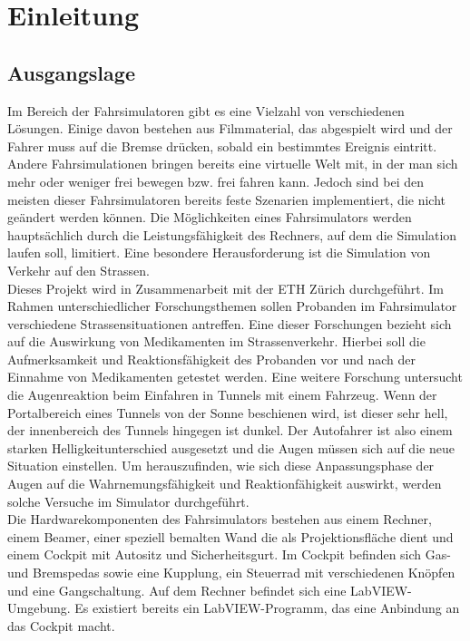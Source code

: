 \section{Einleitung}
\subsection{Ausgangslage}

Im Bereich der Fahrsimulatoren gibt es eine Vielzahl von verschiedenen Lösungen. Einige davon bestehen aus Filmmaterial, das abgespielt wird und der Fahrer muss auf die Bremse drücken, sobald ein bestimmtes Ereignis eintritt. Andere Fahrsimulationen bringen bereits eine virtuelle Welt mit, in der man sich mehr oder weniger frei bewegen bzw. frei fahren kann. Jedoch sind bei den meisten dieser Fahrsimulatoren bereits feste Szenarien implementiert, die  nicht geändert werden können. Die Möglichkeiten eines Fahrsimulators werden hauptsächlich durch die Leistungsfähigkeit des Rechners, auf dem die Simulation laufen soll, limitiert. Eine besondere Herausforderung ist die Simulation von Verkehr auf den Strassen. \\
Dieses Projekt wird in Zusammenarbeit mit der ETH Zürich durchgeführt. Im Rahmen unterschiedlicher Forschungsthemen sollen Probanden im Fahrsimulator verschiedene Strassensituationen antreffen. Eine dieser Forschungen bezieht sich auf die Auswirkung von Medikamenten im Strassenverkehr. Hierbei soll die Aufmerksamkeit und Reaktionsfähigkeit des Probanden vor und nach der Einnahme von Medikamenten getestet werden. Eine weitere Forschung untersucht die Augenreaktion beim Einfahren in Tunnels mit einem Fahrzeug. Wenn der Portalbereich eines Tunnels von der Sonne beschienen wird, ist dieser sehr hell, der innenbereich des Tunnels hingegen ist dunkel. Der Autofahrer ist also einem starken Helligkeitunterschied ausgesetzt und die Augen müssen sich auf die neue Situation einstellen. Um herauszufinden, wie sich diese Anpassungsphase der Augen auf die Wahrnemungsfähigkeit und Reaktionfähigkeit auswirkt, werden solche Versuche im Simulator durchgeführt. \\
Die Hardwarekomponenten des Fahrsimulators bestehen aus einem Rechner, einem Beamer, einer speziell bemalten Wand die als Projektionsfläche dient und einem Cockpit mit Autositz und Sicherheitsgurt. Im Cockpit befinden sich Gas- und Bremspedas sowie eine Kupplung, ein Steuerrad mit verschiedenen Knöpfen und eine Gangschaltung. Auf dem Rechner befindet sich eine LabVIEW-Umgebung. Es existiert bereits ein LabVIEW-Programm, das eine Anbindung an das Cockpit macht.


